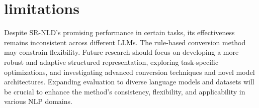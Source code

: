 \section{limitations}


Despite SR-NLD's promising performance in certain tasks, its effectiveness remains inconsistent across different LLMs. The rule-based conversion method may constrain flexibility. Future research should focus on developing a more robust and adaptive structured representation, exploring task-specific optimizations, and investigating advanced conversion techniques and novel model architectures. Expanding evaluation to diverse language models and datasets will be crucial to enhance the method's consistency, flexibility, and applicability in various NLP domains.